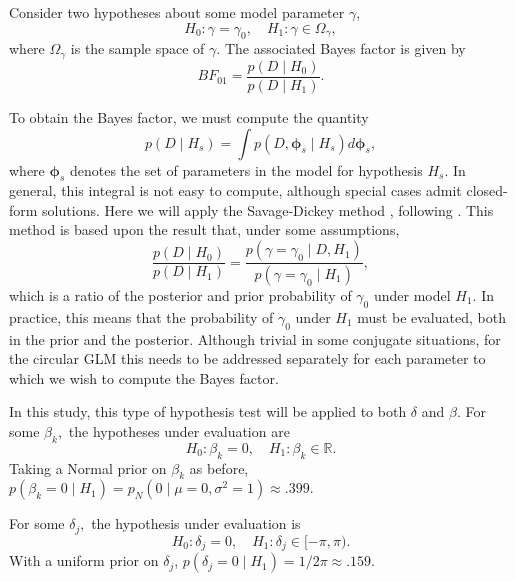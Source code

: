 \documentclass[11pt,a4paper]{article}\usepackage[]{graphicx}\usepackage[]{color}
\newcommand{\bph}{\boldsymbol{\phi}}
\begin{document}
Consider two hypotheses about some model parameter \( \gamma \),
\begin{equation}
H_0 : \gamma = \gamma_0 , \quad H_1 : \gamma \in \Omega_\gamma,
\end{equation}
where \( \Omega_\gamma \) is the sample space of \( \gamma \). The associated Bayes factor is given by
\begin{equation}
BF_{01} = \frac{p(D \mid H_0)}{p(D \mid H_1)}.
\end{equation}

To obtain the Bayes factor, we must compute the quantity
\begin{equation}
p(D \mid H_s) = \int p(D, \bph_s \mid H_s) d \bph_s,
\end{equation}
where \( \bph_s \) denotes the set of parameters in the model for hypothesis \( H_s.\) In general, this integral is not easy to compute, although special cases admit closed-form solutions. Here we will apply the Savage-Dickey method \citep{dickey1970weighted, o2004kendall}, following \citet{wagenmakers2010sdd}. This method is based upon the result that, under some assumptions,
\begin{equation}
\frac{p(D \mid H_0)}{p(D \mid H_1)} = \frac{p(\gamma = \gamma_0 \mid D, H_1)}{p(\gamma = \gamma_0 \mid H_1)},
\end{equation}
which is a ratio of the posterior and prior probability of \( \gamma_0 \) under model \( H_1.\) In practice, this means that the probability of \( \gamma_0 \) under \( H_1 \) must be evaluated, both in the prior and the posterior. Although trivial in some conjugate situations, for the circular GLM this needs to be addressed separately for each parameter to which we wish to compute the Bayes factor.

In this study, this type of hypothesis test will be applied to both \( \delta \) and \( \beta.\) For some \( \beta_k,\) the hypotheses under evaluation are
\begin{equation}
H_0 : \beta_k = 0 , \quad H_1 : \beta_k \in \mathbb{R}.
\end{equation}
Taking a Normal prior on \( \beta_k \) as before, \( p(\beta_k = 0 \mid H_1) = p_N(0 \mid \mu = 0, \sigma^2 = 1) \approx .399.\)

For some \( \delta_j,\) the hypothesis under evaluation is
\begin{equation}
H_0 : \delta_j = 0 , \quad H_1 : \delta_j \in [ -\pi, \pi ).
\end{equation}
With a uniform prior on \(\delta_j \), \( p(\delta_j = 0 \mid H_1) = 1/2\pi \approx .159.\)
\end{document}
